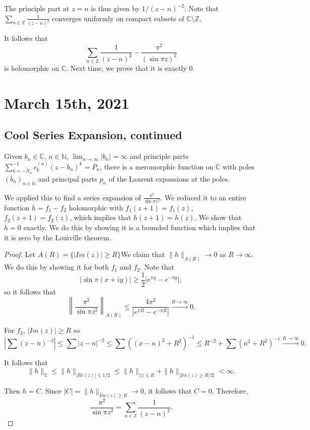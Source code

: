\documentclass[12pt]{scrartcl}
\newcommand{\N}{\mathbb{N}}
\newcommand{\Z}{\mathbb{Z}}
\newcommand{\C}{\mathbb C}
\begin{document}
The principle part at $z = n$ is thus given by $1/(z - n)^{-2}$.  Note that $\sum_{n \in \Z} \frac{1}{(z - n)^2}$ converges uniformly on compact subsets of $\C \setminus \Z$.   

It follows that 
$$\sum_{n \in \Z} \frac{1}{(z - n)^2} - \frac{\pi^2}{(\sin{\pi z})^2}$$
is holomorphic on $\C$.  Next time, we prove that it is exactly $0$.
\pagebreak
\section{March 15th, 2021}
\subsection{Cool Series Expansion, continued}
\begin{theorem} Given $b_n \in \C$, $n \in \N$, $\lim_{n \to \infty} |b_n| = \infty$ and principle parts $\sum_{k = -N_n}^{-1} c_k^{(n)}(z - b_n)^k = P_n$, there is a meromorphic function on $\C$ with poles $(b_n)_{n \in \N}$ and principal parts $p_n$ of the Laurent expansions at the poles.
\end{theorem}
We applied this to find a series expansion of $\frac{\pi^2}{\sin{\pi z}^2}$.  We reduced it to an entire function $h = f_1 - f_2$ holomorphic with $f_1(z + 1) = f_1(z)$, $f_2(z + 1) = f_2(z)$, which implies that $h(z+1) = h(z)$.  We show that $h = 0$ exactly.  We do this by showing it is a bounded function which implies that it is zero by the Louiville theorem.  
\begin{proof}
Let $A(R) = \{|Im(z)| \ge R\} $We claim that $\|h\|_{A(R)} \to 0$ as $R \to \infty$.  We do this by showing it for both $f_1$ and $f_2$.  Note that 
$$|\sin \pi(x + iy)| \ge \frac{1}{2} |e^{\pi y} - e^{-\pi y}|,$$
so it follows that 
$$\left\| \frac{\pi^2}{\sin{\pi z}^2}\right\|_{A(R)} \le \frac{4\pi^2}{|e^{\pi R} - e^{-\pi R}|} \xrightarrow{R \to \infty} 0.$$

For $f_2$, $|Im(z)| \ge R$ so $$|\sum (z-n)^{-2}| \le \sum |z - n|^{-2} \le \sum ((x-n)^2 + R^2)^{-1} \le R^{-2} + \sum (n^2 + R^2)^{-1} \xrightarrow{R \to \infty} 0.$$

It follows that $$\|h\|_\C \le \|h\|_{|Re(z)|\le 1/2} \le \|h\|_{|z| \le R} + \|h\|_{|Im(z) \ge R/2|} < \infty.$$

Then $h = C$.  Since $|C| = \|h\|_{Im(z) \ge R} \to 0$, it follows that $C = 0$.  Therefore, $$\frac{\pi^2}{\sin{\pi z}^2} = \sum_{n \in \Z} \frac{1}{(z - n)^2}.$$
\end{proof}
\end{document}
